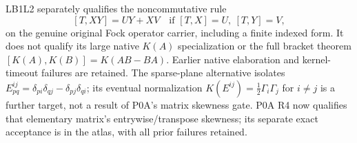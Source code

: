 LB1L2 separately qualifies the noncommutative rule
\[
 [T,XY]=UY+XV\quad\text{if }[T,X]=U,\ [T,Y]=V,
\]
on the genuine original Fock operator carrier, including a finite
indexed form. It does not qualify its large native $K(A)$
specialization or the full bracket theorem
$[K(A),K(B)]=K(AB-BA)$. Earlier native elaboration and kernel-timeout
failures are retained. The sparse-plane alternative isolates
$E^{ij}_{pq}=\delta_{pi}\delta_{qj}-\delta_{pj}\delta_{qi}$;
its eventual normalization $K(E^{ij})=\tfrac12\Gamma_i\Gamma_j$
for $i\ne j$ is a further target, not a result of P0A's matrix
skewness gate. P0A R4 now qualifies that elementary matrix's
entrywise/transpose skewness; its separate exact acceptance is in
the atlas, with all prior failures retained.

